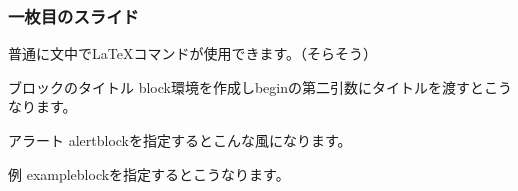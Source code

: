 \documentclass[dvipdfmx,ja=standard]{beamer}
\begin{document}
\begin{frame}
    \frametitle{一枚目のスライド}
    普通に文中で\LaTeX コマンドが使用できます。（そらそう）
    \begin{block}{ブロックのタイトル}
        block環境を作成しbeginの第二引数にタイトルを渡すとこうなります。
    \end{block}
    \begin{alertblock}{アラート}
        alertblockを指定するとこんな風になります。
    \end{alertblock}
    \begin{exampleblock}{例}
        exampleblockを指定するとこうなります。
    \end{exampleblock}
\end{frame}
\end{document}

